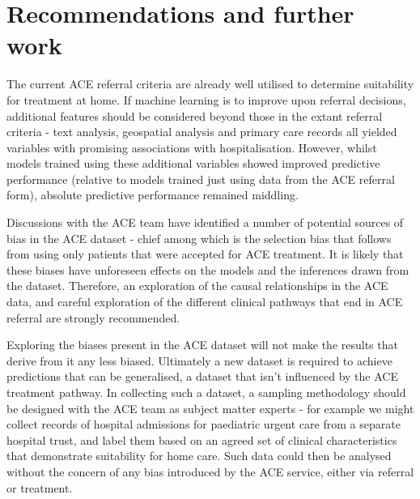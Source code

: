\section*{Recommendations and further work}\label{sec:recommendations-and-further-work}

The current ACE referral criteria are already well utilised to determine suitability for treatment at home. If machine learning is to improve upon referral decisions, additional features should be considered beyond those in the extant referral criteria - text analysis, geospatial analysis and primary care records all yielded variables with promising associations with hospitalisation. However, whilst models trained using these additional variables showed improved predictive performance (relative to models trained just using data from the ACE referral form), absolute predictive performance remained middling. 

Discussions with the ACE team have identified a number of potential sources of bias in the ACE dataset - chief among which is the selection bias that follows from using only patients that were accepted for ACE treatment. It is likely that these biases have unforeseen effects on the models and the inferences drawn from the dataset. Therefore, an exploration of the causal relationships in the ACE data, and careful exploration of the different clinical pathways that end in ACE referral are strongly recommended.

Exploring the biases present in the ACE dataset will not make the results that derive from it any less biased. Ultimately a new dataset is required to achieve predictions that can be generalised, a dataset that isn't influenced by the ACE treatment pathway. In collecting such a dataset, a sampling methodology should be designed with the ACE team as subject matter experts - for example we might collect records of hospital admissions for paediatric urgent care from a separate hospital trust, and label them based on an agreed set of clinical characteristics that demonstrate suitability for home care. Such data could then be analysed without the concern of any bias introduced by the ACE service, either via referral or treatment.